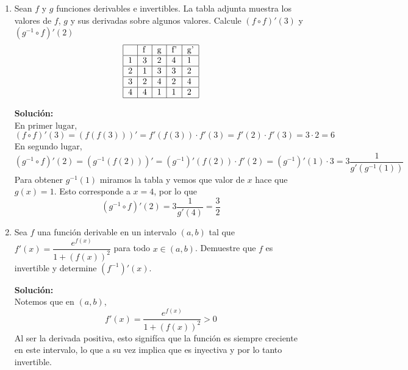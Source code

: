 \documentclass[12pt]{article}
\newenvironment{solucion}
{\begin{mdframed}[backgroundcolor=black!10]
		{\bf Solución:}\\
	}
	{
	\end{mdframed}
}
\newenvironment{preguntas}
{\begin{enumerate}\itemsep12pt
	}
	{
	\end{enumerate}
}
\newcommand{\ra}{\rightarrow}
\begin{document}
\begin{preguntas}
\begin{solucion}
Entonces, 
$$(f^{-1})'(6) = \dfrac{1}{f'(0)}$$
Derivando,
$$f'(x) = 3x^2+3 \ra f'(0) = 3$$
Finalmente,
$$(f^{-1})'(6) = \dfrac{1}{3}$$
\end{solucion}
\item Sean $f$ y $g$ funciones derivables e invertibles. La tabla adjunta muestra los valores de $f$, $g$ y sus derivadas sobre algunos valores. Calcule $(f \circ f)'(3)$ y $(g^{-1} \circ f)'(2)$
$$
\begin{tabular}{|l|l|l|l|l|}
\hline
  & f & g & f' & g' \\ \hline
1 & 3 & 2 & 4  & 1  \\ \hline
2 & 1 & 3 & 3  & 2  \\ \hline
3 & 2 & 4 & 2  & 4  \\ \hline
4 & 4 & 1 & 1  & 2  \\ \hline
\end{tabular}
$$
\begin{solucion}
En primer lugar,
$$(f \circ f)'(3) = (f(f(3)))' = f'(f(3))\cdot f'(3) = f'(2) \cdot f'(3) = 3 \cdot 2 = 6$$
En segundo lugar,	
$$(g^{-1} \circ f)'(2) = (g^{-1}(f(2)))' = (g^{-1})'(f(2)) \cdot f'(2) = (g^{-1})'(1)\cdot 3 = 3\dfrac{1}{g'(g^{-1}(1))}$$
Para obtener $g^{-1}(1)$ miramos la tabla y vemos que valor de $x$ hace que $g(x) = 1$. Esto corresponde a $x=4$, por lo que
$$(g^{-1} \circ f)'(2) = 3\dfrac{1}{g'(4)} = \dfrac{3}{2}$$
\end{solucion}
\item Sea $f$ una función derivable en un intervalo $(a,b)$ tal que $f'(x) = \dfrac{e^{f(x)}}{1+(f(x))^2}$ para todo $x \in (a,b)$. Demuestre que $f$ es invertible y determine $(f^{-1})'(x)$.
\begin{solucion}
Notemos que en $(a,b)$,
$$f'(x) = \dfrac{e^{f(x)}}{1+(f(x))^2} > 0$$
Al ser la derivada positiva, esto signifíca que la función es siempre creciente en este intervalo, lo que a su vez implica que es inyectiva y por lo tanto invertible.\\


\end{solucion}
\end{preguntas}
\end{document}
